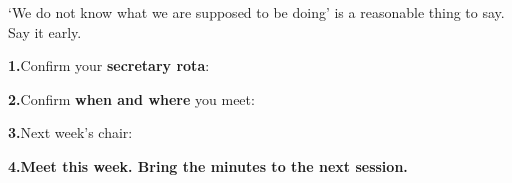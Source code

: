 \begin{center}
{\large\color{inkgrey} `We do not know what we are supposed to be doing'
is a reasonable thing to say. Say it early.}
\end{center}

\newpage
{}

\vspace{0.7cm}

{\LARGE
\textbf{\color{inkblue}1.}\quad Confirm your \textbf{secretary rota}:
\blank[3]\ \blank[3]\ \blank[3]\ \blank[3]

\vspace{1.0em}

\textbf{\color{inkblue}2.}\quad Confirm \textbf{when and where} you meet:
\blank[7]

\vspace{1.0em}

\textbf{\color{inkblue}3.}\quad Next week's chair: \blank[5]

\vspace{1.0em}

\textbf{\color{inkred}4.}\quad \textbf{Meet this week. Bring the
minutes to the next session.}}


